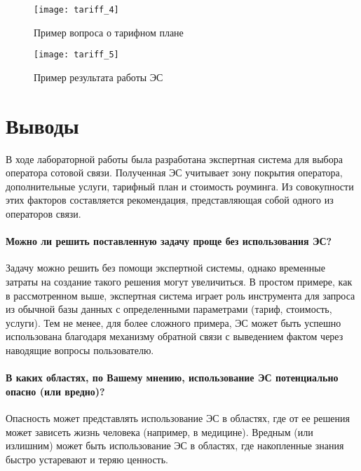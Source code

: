 \begin{figure}[H]
	\centering
	\texttt{[image: tariff\_4]}
	\caption{Пример вопроса о тарифном плане}
\end{figure}

\begin{figure}[H]
	\centering
	\texttt{[image: tariff\_5]}
	\caption{Пример результата работы ЭС}
\end{figure}

\section{Выводы}

В ходе лабораторной работы была разработана экспертная система для выбора оператора сотовой связи. Полученная ЭС учитывает зону покрытия оператора, дополнительные услуги, тарифный план и стоимость роуминга. Из совокупности этих факторов составляется рекомендация, представляющая собой одного из операторов связи.

\paragraph{Можно ли решить поставленную задачу проще без использования ЭС?}

Задачу можно решить без помощи экспертной системы, однако временные затраты на создание такого решения могут увеличиться. В простом примере, как в рассмотренном выше, экспертная система играет роль инструмента для запроса из обычной базы данных с определенными параметрами (тариф, стоимость, услуги).  Тем не менее, для более сложного примера, ЭС может быть успешно использована благодаря механизму обратной связи с выведением фактом через наводящие вопросы пользователю.

\paragraph{В каких областях, по Вашему мнению, использование ЭС потенциально опасно (или вредно)?}

Опасность может представлять использование ЭС в областях, где от ее решения может зависеть жизнь человека (например, в медицине). Вредным (или излишним) может быть использование ЭС в областях, где накопленные знания быстро устаревают и теряю ценность.





